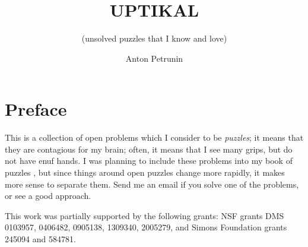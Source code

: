 \documentclass[twoside]{book}
\begin{document}
\title{UPTIKAL}
\subtitle{(unsolved puzzles that I know and love)}
\author{Anton Petrunin}
\date{}
\maketitle



\thispagestyle{empty}
\tableofcontents
\thispagestyle{empty}

\newpage
\thispagestyle{empty}
\section*{Preface}

This is a collection of open problems which I consider to be \emph{puzzles};
it means that they are contagious for my brain;
often, it means that I see many grips, but do not have enuf hands.
I was planning to include these problems into my book of puzzles \cite{petrunin2021pigtikal},
but since things around open puzzles change more rapidly, it makes more sense to separate them.
Send me an email if you solve one of the problems, or see a good approach.


This work was partially supported by the following grants:
NSF grants DMS 
0103957,
0406482,
0905138,
1309340,
2005279,
and Simons Foundation grants 
245094 and 584781.

\null\vfill{}






\backmatter
\newpage
{}
{\scriptsize

}
\sloppy
\printbibliography[heading=bibintoc]
\fussy
\end{document}
